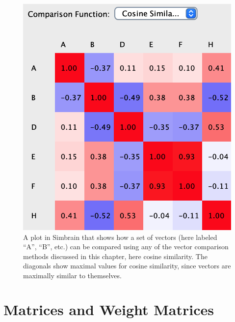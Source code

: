 \begin{figure}[h]
\centering
\includegraphics[scale=.45]{./images/corrPlot.png}
\caption[Simbrain screenshot from Jeff Yoshimi.]{A plot in Simbrain that shows how a set of vectors (here labeled ``A'', ``B'', etc.) can be compared using any of the vector comparison methods discussed in this chapter, here cosine similarity. The diagonals show maximal values for cosine similarity, since vectors are maximally similar to themselves.}
\label{corrPlot}
\end{figure}


\section{Matrices and Weight Matrices}\label{weightMatrices}


